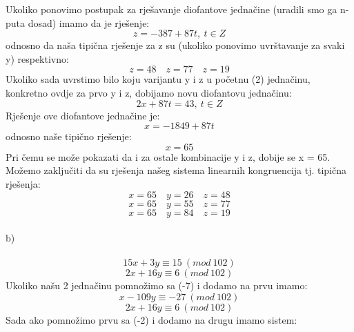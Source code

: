 \documentclass[12pt]{article}
\begin{document}
\begin{enumerate}
Ukoliko ponovimo postupak za rješavanje diofantove jednačine (uradili smo ga n-puta dosad) imamo da je rješenje:
\begin{equation*}
z = -387 + 87t,~t \in Z
\end{equation*}
odnosno da naša tipična rješenje za z su (ukoliko ponovimo uvrštavanje za svaki y) respektivno: 
\begin{equation*}
z = 48 \quad z = 77 \quad z = 19
\end{equation*}		
Ukoliko sada uvrstimo bilo koju varijantu y i z u početnu (2) jednačinu, konkretno ovdje za prvo y i z, dobijamo novu diofantovu jednačinu:
\begin{equation*}
2x + 87t = 43,~t \in Z
\end{equation*}
Rješenje ove diofantove jednačine je:
\begin{equation*}
x = -1849 + 87t
\end{equation*}
odnosno naše tipično rješenje:
\begin{equation*}
x = 65
\end{equation*}
Pri čemu se može pokazati da i za ostale kombinacije y i z, dobije se x = 65.
Možemo zaključiti da su rješenja našeg sistema linearnih kongruencija tj. tipična rješenja:
\begin{equation*}
x = 65 \quad y = 26 \quad z = 48 
\end{equation*} 
\begin{equation*}
x = 65 \quad y = 55 \quad z = 77 
\end{equation*} 
\begin{equation*}
x = 65 \quad y = 84  \quad z = 19 
\end{equation*} 
\\
b) \\
\\
\begin{equation*}
15x + 3y \equiv 15~(mod~102) 
\end{equation*} 
\begin{equation*}
2x + 16y \equiv 6~(mod~102) 
\end{equation*} 
Ukoliko našu 2 jednačinu pomnožimo sa (-7) i dodamo na prvu imamo:
\begin{equation*}
x - 109y \equiv -27~(mod~102) 
\end{equation*} 
\begin{equation*}
2x + 16y \equiv 6~(mod~102) 
\end{equation*} 
Sada ako pomnožimo prvu sa (-2) i dodamo na drugu imamo sistem:
\begin{equation*}

\end{equation*}
\end{enumerate}
\end{document}
